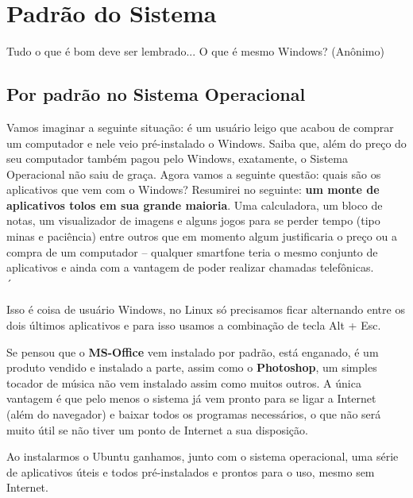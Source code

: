 \chapter{Padrão do Sistema}

\begin{remark}
Tudo o que é bom deve ser lembrado... O que é mesmo Windows? (Anônimo) 
\end{remark}

\section{Por padrão no Sistema Operacional}
Vamos imaginar a seguinte situação: é um usuário leigo que acabou de comprar um computador e nele veio pré-instalado o Windows. Saiba que, além do preço do seu computador também pagou pelo Windows, exatamente, o Sistema Operacional não saiu de graça. Agora vamos a seguinte questão: quais são os aplicativos que vem com o Windows? Resumirei no seguinte: \textbf{um monte de aplicativos tolos em sua grande maioria}. Uma calculadora, um bloco de notas, um visualizador de imagens e alguns jogos para se perder tempo (tipo minas e paciência) entre outros que em momento algum justificaria o preço ou a compra de um computador – qualquer smartfone teria o mesmo conjunto de aplicativos e ainda com a vantagem de poder realizar chamadas telefônicas. \\[3mm]´
\begin{dica} Isso é coisa de usuário Windows, no Linux só precisamos ficar alternando entre os dois últimos aplicativos e para isso usamos a combinação de tecla Alt + Esc.
\end{dica}

Se pensou que o \textbf{MS-Office} vem instalado por padrão, está enganado, é um produto vendido e instalado a parte, assim como o \textbf{Photoshop}, um simples tocador de música não vem instalado assim como muitos outros. A única vantagem é que pelo menos o sistema já vem pronto para se ligar a Internet (além do navegador) e baixar todos os programas necessários, o que não será muito útil se não tiver um ponto de Internet a sua disposição.

Ao instalarmos o Ubuntu ganhamos, junto com o sistema operacional, uma série de aplicativos úteis e todos pré-instalados e prontos para o uso, mesmo sem Internet.


